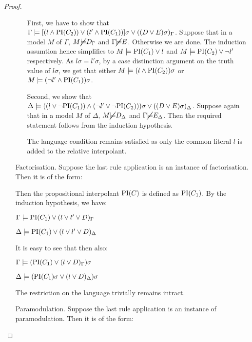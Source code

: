 \begin{proof}
\begin{itemize}
\begin{enumerate}
					First, we have to show that 
					$ \Gamma \models [(l \land \mathrm{PI}(C_2)) \lor (l' \land \mathrm{PI}(C_1)) ]\sigma \lor ((D \lor E)\sigma)_\Gamma$.
					Suppose that in a model $M$ of $\Gamma$, $M \cancel {\models} D_\Gamma$ and $\Gamma \cancel {\models} E$. Otherwise we are done.
					The induction assumtion hence simplifies to $M \models \mathrm{PI}(C_1) \lor l$ and $M \models \mathrm{PI}(C_2) \lor \lnot l'$ respectively.
					As $l\sigma = l'\sigma$, by a case distinction argument on the truth value of $l\sigma$, we get that either $M \models (l \land \mathrm{PI}(C_2))\sigma$ or $M \models  (\lnot l' \land \mathrm{PI}(C_1))\sigma$.


					Second, we show that 
					$\Delta \models ((l \lor \lnot \mathrm{PI}(C_1)) \land (\lnot l' \lor \lnot \mathrm{PI}(C_2)))\sigma \lor ((D \lor E)\sigma)_\Delta$.
					Suppose again that in a model $M$ of $\Delta$, $M \cancel {\models} D_\Delta$ and $\Gamma \cancel {\models} E_\Delta$. 
					Then the required statement follows from the induction hypothesis.
					
					The language condition remains satisfied as only the common literal $l$ is added to the relative interpolant.


			\end{enumerate}

		\item[Factorisation.]	
			Suppose the last rule application is an instance of factorisation. Then it is of the form:
			\begin{prooftree}
			\end{prooftree}

			Then the propositional interpolant $\mathrm{PI}(C)$ is defined as $\mathrm{PI}(C_1)$.
			By the induction hypothesis, we have:

			$\Gamma \models \mathrm{PI}(C_1) \lor (l \lor l' \lor D)_\Gamma$

			$\Delta \models \mathrm{PI}(C_1) \lor (l \lor l' \lor D)_\Delta$

			It is easy to see that then also:

			$\Gamma \models (\mathrm{PI}(C_1)\lor (l \lor D)_\Gamma)\sigma$

			$\Delta \models (\mathrm{PI}(C_1)\sigma \lor (l \lor D)_\Delta)\sigma$

			The restriction on the language trivially remains intract.
			

		\item[Paramodulation.]	
			Suppose the last rule application is an instance of paramodulation. Then it is of the form:
			\begin{prooftree}
				\AxiomCm{C_1: D \lor s=t}
				\AxiomCm{C_2: E[r]}
				\RightLabel{$\quad \sigma = \mgu(s, r)$}
				\BinaryInfCm{C: (D \lor E[t])\sigma}
			\end{prooftree}


\end{itemize}
\end{proof}
